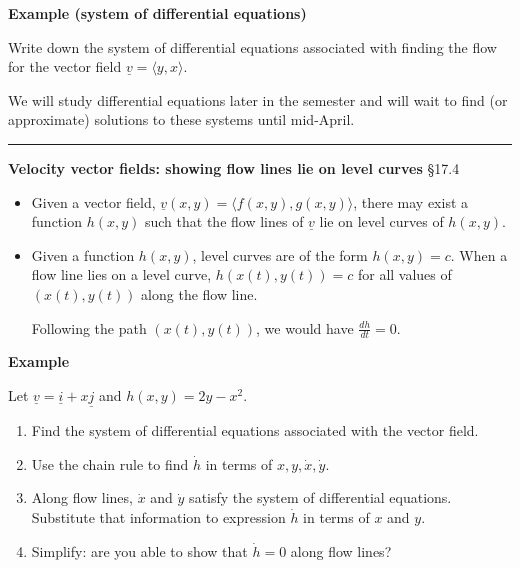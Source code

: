 \documentclass[12pt,letterpaper,noanswers]{exam}
\newcommand{\mb}[1]{\underline{#1}}
\begin{document}
\noindent\textbf{Example (system of differential equations)}

Write down the system of differential equations associated with finding the flow for the vector field $\mb v = \langle y,x\rangle$.
\vspace{1in}

We will study differential equations later in the semester and will wait to find (or approximate) solutions to these systems until mid-April.


\vspace{0.2cm}
\hrule
\vspace{0.2cm}

\noindent\textbf{Velocity vector fields: showing flow lines lie on level curves} \S 17.4
\begin{tcolorbox}
\begin{itemize}
\itemsep0em
    \item Given a vector field, $\mb v(x,y) = \langle f(x,y), g(x,y)\rangle$, there may exist a function $h(x,y)$ such that the flow lines of $\mb v$ lie on level curves of $h(x,y)$.
    \item Given a function $h(x,y)$, level curves are of the form $h(x,y) = c$.  When a flow line lies on a level curve, $h(x(t),y(t)) = c$ for all values of $(x(t),y(t))$ along the flow line.
    
    Following the path $(x(t), y(t))$, we would have $\frac{dh}{dt} = 0$.
    
\end{itemize}
 
\end{tcolorbox}

\noindent\textbf{Example}

Let $\mb v = \mb i + x \mb j$ and $h(x,y) = 2y-x^2$.
\begin{enumerate}
\itemsep4em
    \item Find the system of differential equations associated with the vector field.
    \item Use the chain rule to find $\dot h$ in terms of $x, y, \dot x, \dot y$.
    \item Along flow lines, $\dot x$ and $\dot y$ satisfy the system of differential equations.  Substitute that information to expression $\dot h$ in terms of $x$ and $y$.
    \item Simplify: are you able to show that $\dot h = 0$ along flow lines?
\end{enumerate}
\vspace{1cm}
\end{document}

